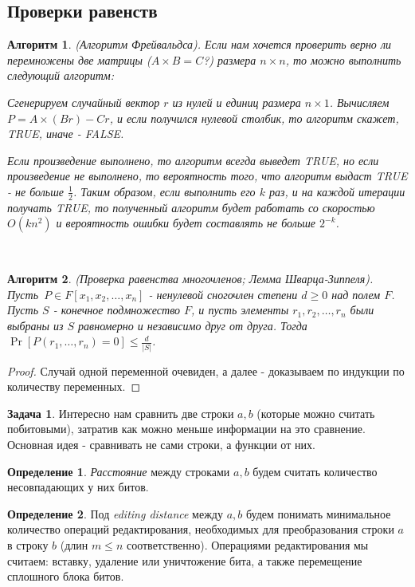 \documentclass[a4paper]{article}
\theoremstyle{indented}
\newtheorem{alg}{Алгоритм}
\theoremstyle{definition}
\newtheorem{defn}{Определение}
\newtheorem{prob}{Задача}
\theoremstyle{remark}
\begin{document}
\subsection{Проверки равенств}

\begin{alg}
    (Алгоритм Фрейвальдса). Если нам хочется проверить верно ли перемножены две матрицы ($A\times B = C$?) размера $n \times n$, то можно выполнить следующий алгоритм: \ 

    Сгенерируем случайный вектор $r$ из нулей и единиц размера $n \times 1$. Вычисляем $P = A \times (B r) - Cr$, и если получился нулевой столбик, то алгоритм скажет, TRUE, иначе - FALSE. \ 

    Если произведение выполнено, то алгоритм всегда выведет TRUE, но если произведение не выполнено, то вероятность того, что алгоритм выдаст TRUE - не больше $\frac{1}{2}$. Таким образом, если выполнить его $k$ раз, и на каждой итерации получать TRUE, то полученный алгоритм будет работать со скоростью $O(kn^2)$ и вероятность ошибки будет составлять не больше $2^{-k}$.
\end{alg} \ 

\begin{alg}
    (Проверка равенства многочленов; Лемма Шварца-Зиппеля). Пусть $P \in F[x_1, x_2, \ldots, x_n]$ - ненулевой сногочлен степени $d \geq 0$ над полем $F$. Пусть $S$ - конечное подмножество $F$, и пусть элементы $r_1, r_2, \ldots, r_n$ были выбраны из $S$ равномерно и независимо друг от друга. Тогда $\Pr[P(r_1, \ldots, r_n) = 0] \leq \frac{d}{|S|}$.
\end{alg}

\begin{proof}
    Случай одной переменной очевиден, а далее - доказываем по индукции по количеству переменных.
\end{proof}

\begin{prob}
    Интересно нам сравнить две строки $a, b$ (которые можно считать побитовыми), затратив как можно меньше информации на это сравнение. Основная идея - сравнивать не сами строки, а функции от них. 
\end{prob}

\begin{defn}
    \textit{Расстояние} между строками $a, b$ будем считать количество несовпадающих у них битов.
\end{defn}

\begin{defn}
    Под \textit{editing distance} между $a, b$ будем понимать минимальное количество операций редактирования, необходимых для преобразования строки $a$ в строку $b$ (длин $m\leq n$ соответственно). Операциями редактирования мы считаем: вставку, удаление или уничтожение бита, а также перемещение сплошного блока битов.
\end{defn}
\end{document}
